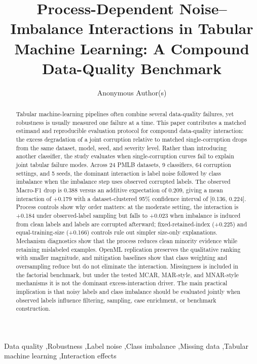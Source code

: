 \documentclass[preprint,12pt,number]{elsarticle}
\begin{document}
\begin{frontmatter}

\title{Process-Dependent Noise--Imbalance Interactions in Tabular Machine Learning: A Compound Data-Quality Benchmark}

\author[inst1]{Anonymous Author(s)}


\begin{abstract}
Tabular machine-learning pipelines often combine several data-quality failures, yet robustness is usually measured one failure at a time. This paper contributes a matched estimand and reproducible evaluation protocol for compound data-quality interaction: the excess degradation of a joint corruption relative to matched single-corruption drops from the same dataset, model, seed, and severity level. Rather than introducing another classifier, the study evaluates when single-corruption curves fail to explain joint tabular failure modes. Across 24 PMLB datasets, 9 classifiers, 64 corruption settings, and 5 seeds, the dominant interaction is label noise followed by class imbalance when the imbalance step uses observed corrupted labels. The observed Macro-F1 drop is 0.388 versus an additive expectation of 0.209, giving a mean interaction of +0.179 with a dataset-clustered 95\% confidence interval of [0.136, 0.224]. Process controls show why order matters: at the moderate setting, the interaction is +0.184 under observed-label sampling but falls to +0.023 when imbalance is induced from clean labels and labels are corrupted afterward; fixed-retained-index (+0.225) and equal-training-size (+0.166) controls rule out simpler size-only explanations. Mechanism diagnostics show that the process reduces clean minority evidence while retaining mislabeled examples. OpenML replication preserves the qualitative ranking with smaller magnitude, and mitigation baselines show that class weighting and oversampling reduce but do not eliminate the interaction. Missingness is included in the factorial benchmark, but under the tested MCAR, MAR-style, and MNAR-style mechanisms it is not the dominant excess-interaction driver. The main practical implication is that noisy labels and class imbalance should be evaluated jointly when observed labels influence filtering, sampling, case enrichment, or benchmark construction.
\end{abstract}

\begin{keyword}
Data quality \sep Robustness \sep Label noise \sep Class imbalance \sep Missing data \sep Tabular machine learning \sep Interaction effects
\end{keyword}

\end{frontmatter}
\end{document}
